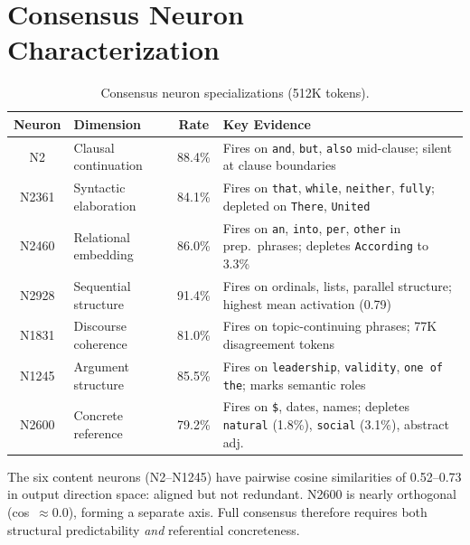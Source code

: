 \documentclass{article}
\begin{document}



\newpage
\appendix

\section{Consensus Neuron Characterization}
\label{app:consensus}

\begin{table}[h]
\centering
\caption{Consensus neuron specializations (512K tokens).}
\label{tab:consensus_full}
\begin{tabular}{@{}clcp{5cm}@{}}
\toprule
Neuron & Dimension & Rate & Key Evidence \\
\midrule
N2     & Clausal continuation   & 88.4\% & Fires on \texttt{and}, \texttt{but}, \texttt{also} mid-clause; silent at clause boundaries \\
N2361  & Syntactic elaboration  & 84.1\% & Fires on \texttt{that}, \texttt{while}, \texttt{neither}, \texttt{fully}; depleted on \texttt{There}, \texttt{United} \\
N2460  & Relational embedding   & 86.0\% & Fires on \texttt{an}, \texttt{into}, \texttt{per}, \texttt{other} in prep.\ phrases; depletes \texttt{According} to 3.3\% \\
N2928  & Sequential structure   & 91.4\% & Fires on ordinals, lists, parallel structure; highest mean activation (0.79) \\
N1831  & Discourse coherence    & 81.0\% & Fires on topic-continuing phrases; 77K disagreement tokens \\
N1245  & Argument structure     & 85.5\% & Fires on \texttt{leadership}, \texttt{validity}, \texttt{one of the}; marks semantic roles \\
\midrule
N2600  & Concrete reference     & 79.2\% & Fires on \texttt{\$}, dates, names; depletes \texttt{natural} (1.8\%), \texttt{social} (3.1\%), abstract adj. \\
\bottomrule
\end{tabular}
\end{table}

The six content neurons (N2--N1245) have pairwise cosine similarities of
0.52--0.73 in output direction space: aligned but not redundant.
N2600 is nearly orthogonal (cos~$\approx 0.0$), forming a separate axis.
Full consensus therefore requires both structural predictability \emph{and}
referential concreteness.
\end{document}
